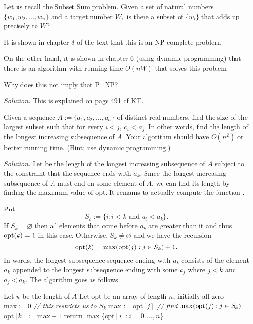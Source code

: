 \documentclass[10pt,reqno]{amsart}
\begin{document}
\begin{outline}[enumerate]
\1 Let us recall the Subset Sum problem. Given a set of natural numbers
$\{w_1,w_2,\dots,w_n\}$ and a target number $W,$ is there a subset of
\(\{w_i\}\) that adds up precisely to $W$?

It is shown in chapter 8 of the text that this is an NP-complete problem.

On the other hand, it is shown in chapter 6 (using dynamic programming) that
there is an algorithm with running time $O(nW)$ that solves this problem

Why does this not imply that P=NP?

\medskip
\noindent \emph{Solution.} This is explained on page 491 of KT.
\medskip

\1 Given a sequence $A := \{a_1,a_2,\dots,a_n\}$ of distinct real numbers, find
the size of the largest subset such that for every $i < j$, $a_i < a_j.$ In
other words, find the length of the longest increasing subsequence of $A.$ Your
algorithm should have $O(n^2)$ or better running time. (Hint: use dynamic
programming.)

\medskip
\noindent \emph{Solution.} Let  be the length of the longest increasing
subsequence of $A$ subject to the constraint that the sequence ends with $a_k$.
Since the longest increasing subsequence of $A$ must end on some element of
$A$, we can find its length by finding the maximum value of opt. It remains to
actually compute the function \opt{\cdot}.

Put \[ S_k := \{ i : i < k \text{ and } a_i < a_k\}.\] If $S_k = \varnothing$
then all elements that come before $a_k$ are greater than it and thus $\mathrm{opt}(k)
= 1$ in this case. Otherwise, $S_k \neq \varnothing$ and we have the recursion
\[\mathrm{opt}(k) = \max (\mathrm{opt}(j) : j \in S_k) + 1.\] In words, the longest subsequence
sequence ending with $a_k$ consists of the element $a_k$ appended to the
longest subsequence ending with some $a_j$ where $j < k$ and $a_j < a_k$. The
algorithm goes as follows.

\begin{algorithmic}[1]
    \State Let $n$ be the length of $A$
    \State Let opt be an array of length $n$, initially all zero
    \State $\mathrm{max} := 0$
     \emph{// this restricts us to $S_k$}
    \State max := opt$[j]$ \emph{// find $\max (\mathrm{opt}(j) : j \in S_k)$}
    \EndIf
    \EndIf
    \EndFor
    \State $\mathrm{opt}[k] := \mathrm{max} + 1$
    \EndFor
    \State return $\max\{\mathrm{opt}[i] : i = 0,\dots,n\}$
    \EndProcedure
\end{algorithmic}

\medskip
\medskip

\end{outline}
\end{document}
